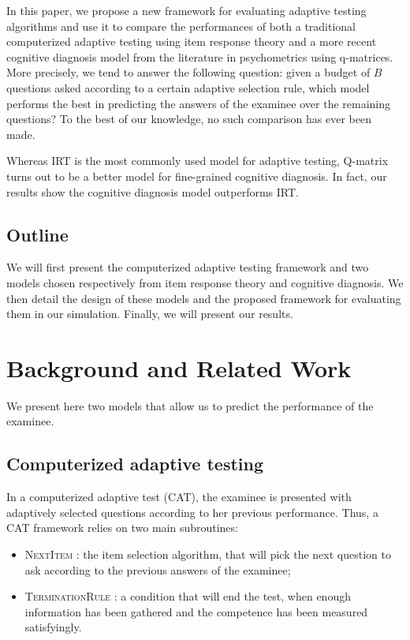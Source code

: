 \documentclass{sig-alternate}
\begin{document}
In this paper, we propose a new framework for evaluating adaptive testing algorithms and use it to compare the performances of both a traditional computerized adaptive testing using item response theory and a more recent cognitive diagnosis model from the literature in psychometrics using q-matrices. More precisely, we tend to answer the following question: given a budget of $B$ questions asked according to a certain adaptive selection rule, which model performs the best in predicting the answers of the examinee over the remaining questions? To the best of our knowledge, no such comparison has ever been made.

Whereas IRT is the most commonly used model for adaptive testing, Q-matrix turns out to be a better model for fine-grained cognitive diagnosis. In fact, our results show the cognitive diagnosis model outperforms IRT.

\subsection{Outline}

We will first present the computerized adaptive testing framework and two models chosen respectively from item response theory and cognitive diagnosis. We then detail the design of these models and the proposed framework for evaluating them in our simulation. Finally, we will present our results.

\section{Background and Related Work}

We present here two models that allow us to predict the performance of the examinee.

\subsection{Computerized adaptive testing}

In a computerized adaptive test (CAT), the examinee is presented with adaptively selected questions according to her previous performance. Thus, a CAT framework relies on two main subroutines:
\begin{itemize}
\item \textsc{NextItem} : the item selection algorithm, that will pick the next question to ask according to the previous answers of the examinee;
\item \textsc{TerminationRule} : a condition that will end the test, when enough information has been gathered and the competence has been measured satisfyingly.
\end{itemize}
\end{document}
